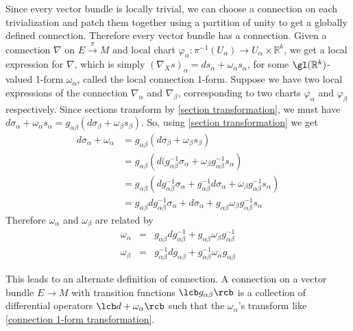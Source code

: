 Since every vector bundle is locally trivial, we can choose a connection on each trivialization and patch them together using a partition of unity to get a globally defined connection. Therefore every vector bundle has a connection. Given a connection $\nabla$ on $E \stackrel{\pi}{\rightarrow} M$ and local chart $\varphi_\alpha : \pi^{-1}(U_\alpha) \rightarrow U_\alpha \times \mathbb R^k$, we get a local expression for $\nabla$, which is simply $(\nabla_X s)_\alpha = ds_\alpha + \omega_\alpha s_\alpha$, for some $\gl(\mathbb R^k)$-valued 1-form $\omega_\alpha$, called the local connection 1-form. Suppose we have two local expressions of the connection $\nabla_\alpha$ and $\nabla_\beta$, corresponding to two charts $\varphi_\alpha$ and $\varphi_\beta$ respectively. Since sections transform by \eqref{section transformation}, we must have $d\sigma_\alpha + \omega_\alpha s_\alpha = g_{\alpha\beta} (d \sigma_\beta + \omega_\beta s_\beta)$. So, using \eqref{section transformation} we get
\begin{align*}
	d\sigma_\alpha + \omega_\alpha &= g_{\alpha\beta} (d \sigma_\beta + \omega_\beta s_\beta) \\
	                               &= g_{\alpha\beta} \left( d (g_{\alpha\beta}^{-1} \sigma_\alpha + \omega_\beta g_{\alpha\beta}^{-1} s_\alpha \right) \\
	                               &= g_{\alpha\beta} \left( dg_{\alpha\beta}^{-1} \sigma_\alpha + g_{\alpha\beta}^{-1} d\sigma_\alpha + \omega_\beta g_{\alpha\beta}^{-1} s_\alpha \right) \\
	                               &= g_{\alpha\beta} dg_{\alpha\beta}^{-1} \sigma_\alpha + d\sigma_\alpha + g_{\alpha\beta} \omega_\beta g_{\alpha\beta}^{-1} s_{\alpha} 
\end{align*}
Therefore $\omega_\alpha$ and $\omega_\beta$ are related by
\begin{equation}
\label{connection 1-form transformation}
\begin{array}{rcl}
	\omega_\alpha &=& g_{\alpha\beta} dg_{\alpha\beta}^{-1} + g_{\alpha\beta} \omega_\beta g_{\alpha\beta}^{-1} \\
	\omega_\beta  &=& g_{\alpha\beta}^{-1} dg_{\alpha\beta} + g_{\alpha\beta}^{-1} \omega_\alpha g_{\alpha\beta}
\end{array}
\end{equation}

This leads to an alternate definition of connection. A connection on a vector bundle $E \rightarrow M$ with transition functions $\lcb g_{\alpha\beta} \rcb$ is a collection of differential operators $\lcb d + \omega_\alpha \rcb$ such that the $\omega_\alpha$'s transform like \eqref{connection 1-form transformation}. 

